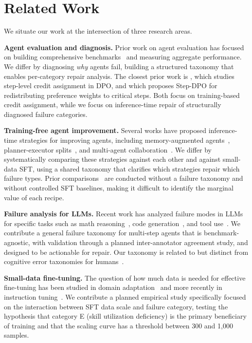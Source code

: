\section{Related Work}
\label{sec:related}
We situate our work at the intersection of three research areas.

\textbf{Agent evaluation and diagnosis.} Prior work on agent evaluation has focused on building comprehensive benchmarks~\citep{liu2023benchmarking,zheng2023judging} and measuring aggregate performance. We differ by diagnosing \emph{why} agents fail, building a structured taxonomy that enables per-category repair analysis. The closest prior work is \citet{zeng2024token}, which studies step-level credit assignment in DPO, and \citet{lai2024step} which proposes Step-DPO for redistributing preference weights to critical steps. Both focus on training-based credit assignment, while we focus on inference-time repair of structurally diagnosed failure categories.

\textbf{Training-free agent improvement.} Several works have proposed inference-time strategies for improving agents, including memory-augmented agents~\citep{le2022memory}, planner-executor splits~\citep{yao2023react}, and multi-agent collaboration~\citep{li2023multiagent}. We differ by systematically comparing these strategies against each other and against small-data SFT, using a shared taxonomy that clarifies which strategies repair which failure types. Prior comparisons~\citep{rporto2024agentrecipes} are conducted without a failure taxonomy and without controlled SFT baselines, making it difficult to identify the marginal value of each recipe.

\textbf{Failure analysis for LLMs.} Recent work has analyzed failure modes in LLMs for specific tasks such as math reasoning~\citep{tran2024understanding}, code generation~\citep{zhang2024debugging}, and tool use~\citep{patil2024evaluating}. We contribute a general failure taxonomy for multi-step agents that is benchmark-agnostic, with validation through a planned inter-annotator agreement study, and designed to be actionable for repair. Our taxonomy is related to but distinct from cognitive error taxonomies for humans~\citep{stanovich2011robot}.

\textbf{Small-data fine-tuning.} The question of how much data is needed for effective fine-tuning has been studied in domain adaptation~\citep{chen2021evaluate,zheng2023judging} and more recently in instruction tuning~\citep{zhou2024data}. We contribute a planned empirical study specifically focused on the interaction between SFT data scale and failure category, testing the hypothesis that category E (skill utilization deficiency) is the primary beneficiary of training and that the scaling curve has a threshold between 300 and 1,000 samples.
